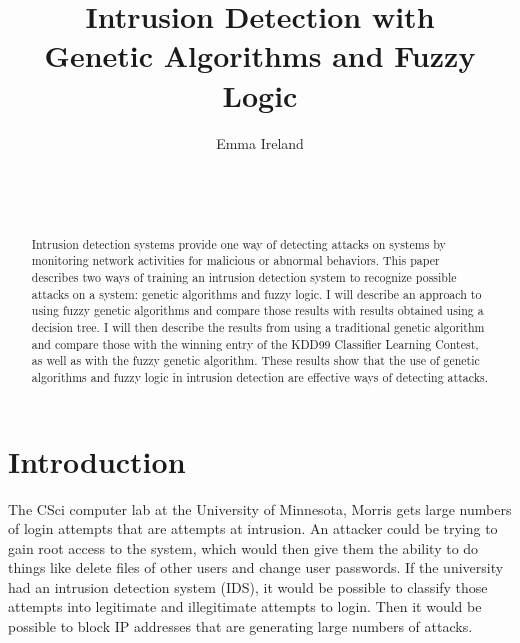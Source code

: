 \documentclass{sig-alternate}
\begin{document}

\title{Intrusion Detection with \\ Genetic Algorithms and Fuzzy Logic}


\author{
\alignauthor
Emma Ireland\\
	\\
	\\
	\\
}

\maketitle
\begin{abstract}
Intrusion detection systems provide one way of detecting attacks on systems by monitoring network activities for malicious or abnormal behaviors. This paper describes two ways of training an intrusion detection system to recognize possible attacks on a system: genetic algorithms and fuzzy logic. I will describe an approach to using fuzzy genetic algorithms and compare those results with results obtained using a decision tree. I will then describe the results from using a traditional genetic algorithm and compare those with the winning entry of the KDD99 Classifier Learning Contest, as well as with the fuzzy genetic algorithm. These results show that the use of genetic algorithms and fuzzy logic in intrusion detection are effective ways of detecting attacks.
\end{abstract}




\section{Introduction}
The CSci computer lab at the University of Minnesota, Morris gets large numbers of login attempts that are attempts at intrusion. An attacker could be trying to gain root access to the system, which would then give them the ability to do things like delete files of other users and change user passwords. If the university had an intrusion detection system (IDS), it would be possible to classify those attempts into legitimate and illegitimate attempts to login. Then it would be possible to block IP addresses that are generating large numbers of attacks.
\end{document}

